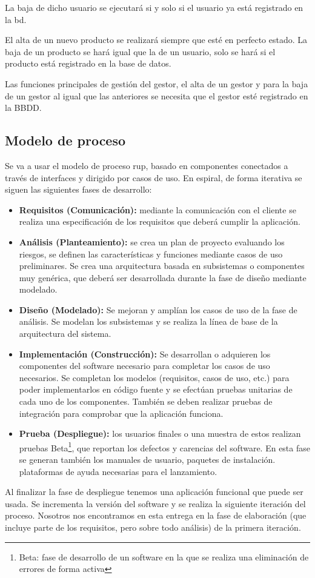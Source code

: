 \noindent La baja de dicho usuario se ejecutará si y solo si el usuario ya está registrado en la \gls{bd}.

El alta de un nuevo producto se realizará siempre que esté en perfecto estado. La baja de un producto se hará igual que la de un usuario, solo se hará si el producto está registrado en la base de datos.

Las funciones principales de gestión del gestor, el alta de un gestor y para la baja de un gestor al igual que las anteriores se necesita que el gestor esté registrado en la BBDD.

\subsection{Modelo de proceso}
Se va a usar el modelo de proceso \gls{rup}, basado en componentes conectados a través de interfaces y dirigido por casos de uso. En espiral, de forma iterativa se siguen las siguientes fases de desarrollo:
\begin{itemize}
	\item\textbf{Requisitos (Comunicación):} mediante la comunicación con el cliente se realiza una especificación de los requisitos que deberá cumplir la aplicación.
	\item\textbf{Análisis (Planteamiento):} se crea un plan de proyecto evaluando los riesgos, se definen las características y funciones mediante casos de uso preliminares. Se crea una arquitectura basada en subsistemas o componentes muy genérica, que deberá ser desarrollada durante la fase de diseño mediante modelado.
	\item\textbf{Diseño (Modelado):} Se mejoran y amplían los casos de uso de la fase de análisis. Se modelan los subsistemas y se realiza la línea de base de la arquitectura del sistema.
	\item\textbf{Implementación (Construcción): }Se desarrollan o adquieren los componentes del software necesario para completar los casos de uso necesarios. Se completan los modelos (requisitos, casos de uso, etc.) para poder implementarlos en código fuente y se efectúan pruebas unitarias de cada uno de los componentes. También se deben realizar pruebas de integración para comprobar que la aplicación funciona.
	\item\textbf{Prueba (Despliegue):} los usuarios finales o una muestra de estos realizan pruebas Beta\footnote{Beta: fase de desarrollo de un software en la que se realiza una eliminación de errores de forma activa}, que reportan los defectos y carencias del software. En esta fase se generan también los manuales de usuario, paquetes de instalación. plataformas de ayuda necesarias para el lanzamiento.
\end{itemize}

Al finalizar la fase de despliegue tenemos una aplicación funcional que puede ser usada. Se incrementa la versión del software y se realiza la siguiente iteración del proceso. Nosotros nos encontramos en esta entrega en la fase de elaboración (que incluye parte de los requisitos, pero sobre todo análisis) de la primera iteración.
